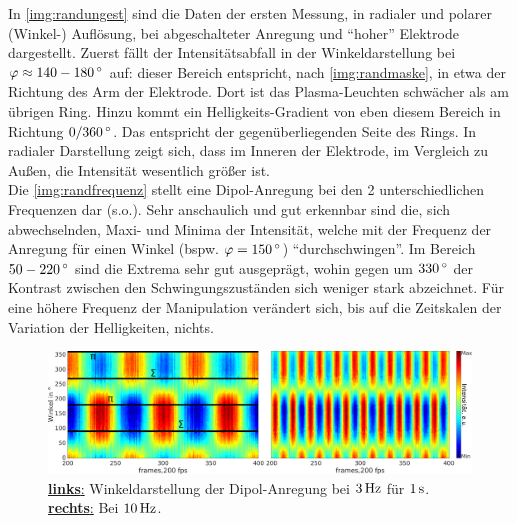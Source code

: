 \documentclass[numbers=noenddot,a4paper,notitlepage,twoside,BCOR15mm]{scrbook}
\newcommand{\degree}{^\circ}
\newcommand{\fett}[1]{\textbf{#1}}
\begin{document}
			In \autoref{img:randungest} sind die Daten der ersten Messung, in radialer und polarer (Winkel-) Auflösung, bei abgeschalteter Anregung und "`hoher"' Elektrode dargestellt. Zuerst fällt der Intensitätsabfall in der Winkeldarstellung bei $\varphi\approx\unit[140-180]{\degree}$ auf: dieser Bereich entspricht, nach \autoref{img:randmaske}, in etwa der Richtung des Arm der Elektrode. Dort ist das Plasma-Leuchten schwächer als am übrigen Ring. Hinzu kommt ein Helligkeits-Gradient von eben diesem Bereich in Richtung $\unit[0/360]{\degree}$. Das entspricht der gegenüberliegenden Seite des Rings. In radialer Darstellung zeigt sich, dass im Inneren der Elektrode, im Vergleich zu Außen, die Intensität wesentlich größer ist.\\
			Die \autoref{img:randfrequenz} stellt eine Dipol-Anregung bei den 2 unterschiedlichen Frequenzen dar (s.o.).  Sehr anschaulich und gut erkennbar sind die, sich abwechselnden, Maxi- und Minima der Intensität, welche mit der Frequenz der Anregung für einen Winkel (bspw. $\varphi=\unit[150]{\degree}$) "`durchschwingen"'. Im Bereich $\unit[50-220]{\degree}$ sind die Extrema sehr gut ausgeprägt, wohin gegen um $\unit[330]{\degree}$ der Kontrast zwischen den Schwingungszuständen sich weniger stark abzeichnet. Für eine höhere Frequenz der Manipulation verändert sich, bis auf die Zeitskalen der Variation der Helligkeiten, nichts.

				\begin{figure}[!b]
			       	\centering
			       	\includegraphics[width=\textwidth,height=0.38\textwidth]{figs/auswertung/plasmaglw/randdipol3hzu10Hz1sekwink.png}
			       	\caption{\underline{\fett{links}:} Winkeldarstellung der Dipol-Anregung bei $\unit[3]{Hz}$ für $\unit[1]{s}$. \underline{\fett{rechts}:} Bei $\unit[10]{Hz}$.}
			       	\label{img:randfrequenz}
				\end{figure}
\end{document}
